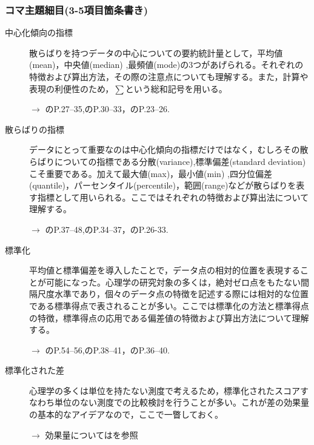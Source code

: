 \subsubsection{コマ主題細目(3-5項目箇条書き)}
\begin{description}
	\item[中心化傾向の指標] 散らばりを持つデータの中心についての要約統計量として，平均値(mean)，中央値(median) ,最頻値(mode)の3つがあげられる。それぞれの特徴および算出方法，その際の注意点についても理解する。また，計算や表現の利便性のため，$\sum$という総和記号を用いる。
	      \begin{flushright}
		      $\to$ \textcite{Yamauchi201001}のP.27--35,\textcite{Yamada2004}のP.30--33，\textcite{Kawabata201408}のP.23--26.
	      \end{flushright}

	\item[散らばりの指標] データにとって重要なのは中心化傾向の指標だけではなく，むしろその散らばりについての指標である分散(variance),標準偏差(standard deviation)こそ重要である。加えて最大値(max)，最小値(min) ,四分位偏差(quantile)，パーセンタイル(percentile)，範囲(range)などが散らばりを表す指標として用いられる。ここではそれぞれの特徴および算出法について理解する。
	      \begin{flushright}
		      $\to$ \textcite{Yamauchi201001}のP.37--48,\textcite{Yamada2004}のP.34--37，\textcite{Kawabata201408}のP.26-33.
	      \end{flushright}

	\item[標準化]平均値と標準偏差を導入したことで，データ点の相対的位置を表現することが可能になった。心理学の研究対象の多くは，絶対ゼロ点をもたない間隔尺度水準であり，個々のデータ点の特徴を記述する際には相対的な位置である標準得点で表されることが多い。ここでは標準化の方法と標準得点の特徴，標準得点の応用である偏差値の特徴および算出方法について理解する。
	      \begin{flushright}
		      $\to$ \textcite{Yamauchi201001}のP.54--56,\textcite{Yamada2004}のP.38--41，\textcite{Kawabata201408}のP.36--40.
	      \end{flushright}

	\item[標準化された差]心理学の多くは単位を持たない測度で考えるため，標準化されたスコアすなわち単位のない測度での比較検討を行うことが多い。これが差の効果量の基本的なアイデアなので，ここで一瞥しておく。

	      \begin{flushright}
		      $\to$ 効果量については\textcite{Matia201201}を参照
	      \end{flushright}


\end{description}
